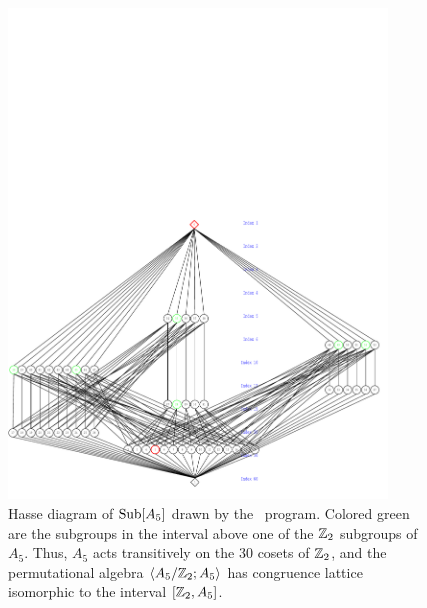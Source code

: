 \begin{figure}[h!]
\begin{center}
\vspace{-5cm}
\includegraphics[height=13cm]{A5UpperN5.pdf}%
\caption{Hasse diagram of $\operatorname{Sub}[A_5]$ drawn by the \xgap\ program. Colored green are the
subgroups in the interval above one of the $\mathbb{Z}_2$ subgroups of $A_5$.  Thus,
$A_5$ acts transitively on the 30 cosets of $\mathbb{Z}_2$, and the
permutational algebra $\langle A_5/\mathbb{Z}_2; A_5\rangle$ has congruence lattice isomorphic to 
the interval $[\mathbb{Z}_2, A_5]$.}
\label{fig:A5new}
\end{center}
\end{figure}

